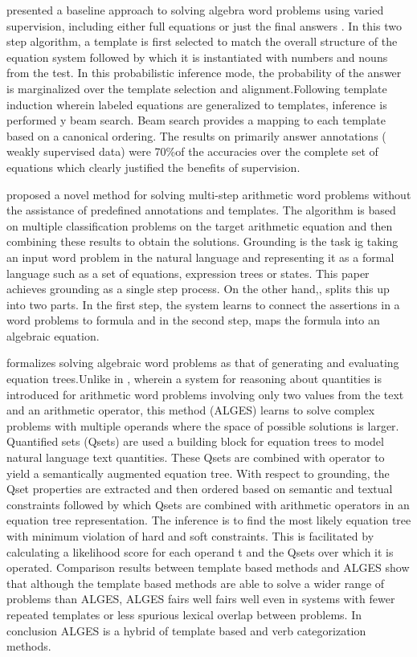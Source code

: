 \documentclass[11pt,letterpaper]{article}
\begin{document}
\citep{Kushman2014LearningTA} presented a baseline approach to solving algebra word problems using varied supervision, including either full equations or just the final answers . In this two step algorithm,  a template is first selected to match the overall structure of the equation system followed by which it is instantiated with numbers and nouns from the test. In this probabilistic inference mode, the probability of the answer is marginalized over the template selection and alignment.Following template induction wherein labeled equations are generalized to templates, inference is performed y beam search. Beam search provides a mapping to each template based on a canonical ordering. The results on primarily answer annotations ( weakly supervised data) were 70\%of the accuracies over the complete set of equations which clearly justified the benefits of supervision. 

\cite{roy2016solving} proposed a novel method for solving multi-step arithmetic word problems without the assistance of predefined annotations and templates. The algorithm is based on multiple classification problems on the target arithmetic equation and then combining these results to obtain the solutions. Grounding is the task ig taking an input word problem in the natural language and representing it as a formal language such as a set of equations, expression trees or states. This paper achieves grounding as a single step process. On the other hand,\citep{mitra2016learning}, splits this up into two parts. In the first step, the system learns to connect the assertions in a word problems to formula and in the second step, maps the formula into an algebraic equation.

\cite{KoncelKedziorski2015ParsingAW} formalizes solving algebraic word problems as that of generating and evaluating equation trees.Unlike in \cite{roy2017reasoning}, wherein a system for reasoning about quantities is introduced for arithmetic word problems involving only two values from the text and an arithmetic operator, this method (ALGES) learns to solve complex problems with multiple operands where the space of possible solutions is larger. Quantified sets (Qsets) are used a building block for equation trees to model natural language text quantities. These Qsets are combined with operator to yield a semantically augmented equation tree. With respect to grounding, the Qset properties are extracted and then ordered based on semantic and textual constraints followed by which Qsets are combined with arithmetic operators in an equation tree representation. The inference is to find the most likely equation tree with minimum violation of hard and soft constraints. This is facilitated by calculating a likelihood score for each operand t and the Qsets over which it is operated. Comparison results between template based methods and ALGES show
that although the template based methods are able to solve a wider range of problems than ALGES, ALGES fairs well fairs well even in systems with fewer repeated templates or less spurious lexical overlap between problems. In conclusion ALGES is a hybrid of template based and verb categorization methods.
\end{document}
